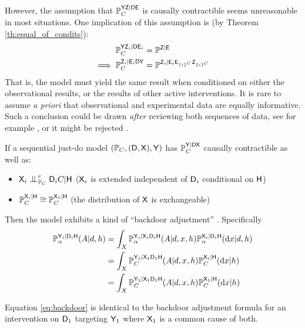 However, the assumption that $\mathbb{P}_C^{\mathsf{YZ}|\mathsf{DE}}$ is causally contractible seems unreasonable in most situations. One implication of this assumption is (by Theorem \ref{th:equal_of_condits}):
\begin{align}
    \mathbb{P}^{\mathsf{Y}\mathsf{Z}_i|\mathsf{D}\mathsf{E}_i}_C &= \mathbb{P}^{\mathsf{Z}|\mathsf{E}}\\
    \implies \mathbb{P}^{\mathsf{Z}_i|\mathsf{E}_i\mathsf{D}\mathsf{Y}}_C &= \mathbb{P}^{\mathsf{Z}_{i}|\mathsf{E}_i\mathsf{E}_{\{i\}^C}\mathsf{Z}_{\{i\}^C}}
\end{align}
That is, the model must yield the same result when conditioned on either the observational results, or the results of other active interventions. It is rare to assume \emph{a priori} that observational and experimental data are equally informative. Such a conclusion could be drawn \emph{after} reviewing both sequences of data, see for example \citet{eckles_bias_2021}, or it might be rejected \citet{gordon_comparison_2018,gordon_close_2022}.

\begin{example}\label{ex:backdoor}
If a sequential just-do model $(\mathbb{P}_C,(\mathsf{D},\mathsf{X}),\mathsf{Y})$ has $\mathbb{P}_C^{\mathsf{Y}|\mathsf{DX}}$ causally contractible as well as:
\begin{itemize}
    \item $\RV{X}_{i}\CI^e_{\prob{P}_C}\RV{D}_{i}C|\RV{H}$ ($\mathsf{X}_i$ is extended independent of $\mathsf{D}_i$ conditional on $\mathsf{H}$)
    \item $\mathbb{P}_C^{\mathsf{X}_{i}|\mathsf{H}}\cong \mathbb{P}_C^{\mathsf{X}_{1}|\mathsf{H}}$ (the distribution of $\mathsf{X}$ is exchangeable)
 \end{itemize}
Then the model exhibits a kind of ``backdoor adjustment'' \citet[Chap. 1]{pearl_causality:_2009}. Specifically
\begin{align}
    \mathbb{P}_\alpha^{\mathsf{Y}_{i}|\mathsf{D}_{i}\mathsf{H}}(A|d,h) &= \int_X \mathbb{P}_\alpha^{\mathsf{Y}_{i}|\mathsf{X}_{i}\mathsf{D}_{i}\mathsf{H}}(A|d,x,h)\mathbb{P}_\alpha^{\mathsf{X}_{i}|\mathsf{D}_{i}\mathsf{H}}(\mathrm{d}x|d,h)\\
    &= \int_X \mathbb{P}_C^{\mathsf{Y}_{1}|\mathsf{X}_{1}\mathsf{D}_{1}\mathsf{H}}(A|d,x,h)\mathbb{P}_C^{\mathsf{X}_{i}|\mathsf{H}}(\mathrm{d}x|h)\\
    &= \int_X \mathbb{P}_C^{\mathsf{Y}_{1}|\mathsf{X}_{1}\mathsf{D}_{1}\mathsf{H}}(A|d,x,h)\mathbb{P}_C^{\mathsf{X}_{1}|\mathsf{H}}(\mathrm{d}x|h)\label{eq:backdoor}
\end{align}
\end{example}


Equation \ref{eq:backdoor} is identical to the backdoor adjustment formula for an intervention on $\mathsf{D}_1$ targeting $\mathsf{Y}_1$ where $\mathsf{X}_1$ is a common cause of both.

